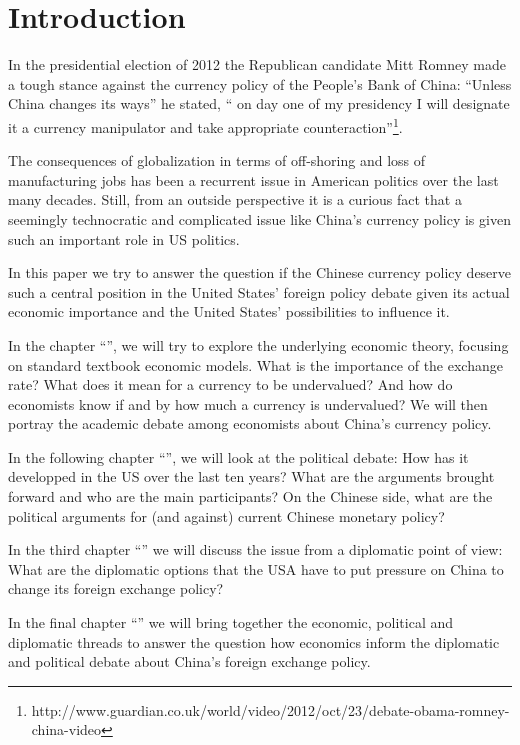 \section{Introduction}
\label{sec:introduction}

In the presidential election of 2012 the Republican candidate Mitt 
Romney made a tough stance against the currency policy of the People's 
Bank of China: ``Unless China changes its ways'' he stated, `` on day 
one of my presidency I will designate it a currency manipulator and take 
appropriate 
counteraction''\footnote{http://www.guardian.co.uk/world/video/2012/oct/23/debate-obama-romney-china-video}.

The consequences of globalization in terms of off-shoring and loss of 
manufacturing jobs has been a recurrent issue in American politics over 
the last many decades. Still, from an outside perspective it is a 
curious fact that a seemingly technocratic and complicated issue like 
China's currency policy is given such an important role in US politics.  

In this paper we try to answer the question if the Chinese currency 
policy deserve such a central position in the United States' foreign 
policy debate given its actual economic importance and the United 
States' possibilities to influence it.


In the chapter ``'', we will try to explore the 
underlying economic theory, focusing on standard textbook economic 
models.  What is the importance of the exchange rate?  What does it mean 
for a currency to be undervalued? And how do economists know if and by 
how much a currency is undervalued? We will then portray the academic 
debate among economists about China's currency policy. 

In the following chapter ``'', we will look at the 
political debate: How has it developped in the US over the last ten 
years?  What are the arguments brought forward and who are the main 
participants? On the Chinese side, what are the political arguments for 
(and against) current Chinese monetary policy?  

In the third chapter ``'' we will discuss the 
issue from a diplomatic point of view: What are the diplomatic options 
that the USA have to put pressure on China to change its foreign 
exchange policy? 

In the final chapter ``'' we will bring together 
the economic, political and diplomatic threads to answer the question 
how economics inform the diplomatic and political debate about China's 
foreign exchange policy.
